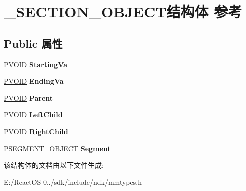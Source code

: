 \hypertarget{struct___s_e_c_t_i_o_n___o_b_j_e_c_t}{}\section{\+\_\+\+S\+E\+C\+T\+I\+O\+N\+\_\+\+O\+B\+J\+E\+C\+T结构体 参考}
\label{struct___s_e_c_t_i_o_n___o_b_j_e_c_t}
\subsection*{Public 属性}
\begin{DoxyCompactItemize}
\item 
\mbox{\label{struct___s_e_c_t_i_o_n___o_b_j_e_c_t_ace0f94fd430c69b371ca13f647d79042}} 
\hyperlink{interfacevoid}{P\+V\+O\+ID} {\bfseries Starting\+Va}
\item 
\mbox{\label{struct___s_e_c_t_i_o_n___o_b_j_e_c_t_a02a7e074df35fa9979ef3df156275865}} 
\hyperlink{interfacevoid}{P\+V\+O\+ID} {\bfseries Ending\+Va}
\item 
\mbox{\label{struct___s_e_c_t_i_o_n___o_b_j_e_c_t_a69ff483798f664733e7fcff80609afca}} 
\hyperlink{interfacevoid}{P\+V\+O\+ID} {\bfseries Parent}
\item 
\mbox{\label{struct___s_e_c_t_i_o_n___o_b_j_e_c_t_a787c7b580113916271a687f754d9c3c4}} 
\hyperlink{interfacevoid}{P\+V\+O\+ID} {\bfseries Left\+Child}
\item 
\mbox{\label{struct___s_e_c_t_i_o_n___o_b_j_e_c_t_a8a26cfa727a0c0e494e8b35f59b28007}} 
\hyperlink{interfacevoid}{P\+V\+O\+ID} {\bfseries Right\+Child}
\item 
\mbox{\label{struct___s_e_c_t_i_o_n___o_b_j_e_c_t_ab4cae818dbe86bcb11d643cc5d4366c8}} 
\hyperlink{struct___s_e_g_m_e_n_t___o_b_j_e_c_t}{P\+S\+E\+G\+M\+E\+N\+T\+\_\+\+O\+B\+J\+E\+CT} {\bfseries Segment}
\end{DoxyCompactItemize}


该结构体的文档由以下文件生成\+:\begin{DoxyCompactItemize}
\item 
E\+:/\+React\+O\+S-\/0../sdk/include/ndk/mmtypes.\+h\end{DoxyCompactItemize}
